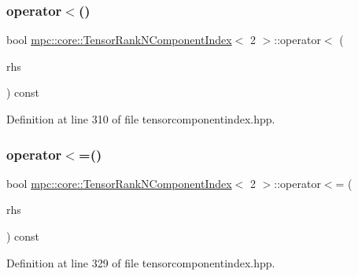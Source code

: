 \subsubsection{\texorpdfstring{operator$<$()}{operator<()}}
{\footnotesize\ttfamily bool \mbox{\hyperlink{classmpc_1_1core_1_1_tensor_rank_n_component_index}{mpc\+::core\+::\+Tensor\+Rank\+N\+Component\+Index}}$<$ 2 $>$\+::operator$<$ (\begin{DoxyParamCaption}\item[{const \mbox{\hyperlink{classmpc_1_1core_1_1_tensor_rank_n_component_index}{Tensor\+Rank\+N\+Component\+Index}}$<$ 2 $>$ \&}]{rhs }\end{DoxyParamCaption}) const\hspace{0.3cm}{\ttfamily [inline]}}



Definition at line 310 of file tensorcomponentindex.\+hpp.

\mbox{\label{classmpc_1_1core_1_1_tensor_rank_n_component_index_3_012_01_4_a791506c8e8a0b12384b476e3ee383e4c}} 
\subsubsection{\texorpdfstring{operator$<$=()}{operator<=()}}
{\footnotesize\ttfamily bool \mbox{\hyperlink{classmpc_1_1core_1_1_tensor_rank_n_component_index}{mpc\+::core\+::\+Tensor\+Rank\+N\+Component\+Index}}$<$ 2 $>$\+::operator$<$= (\begin{DoxyParamCaption}\item[{const \mbox{\hyperlink{classmpc_1_1core_1_1_tensor_rank_n_component_index}{Tensor\+Rank\+N\+Component\+Index}}$<$ 2 $>$ \&}]{rhs }\end{DoxyParamCaption}) const\hspace{0.3cm}{\ttfamily [inline]}}



Definition at line 329 of file tensorcomponentindex.\+hpp.

\mbox{\label{classmpc_1_1core_1_1_tensor_rank_n_component_index_3_012_01_4_a1c3cdc913993da73dd1dae587ef7ebbc}} 
